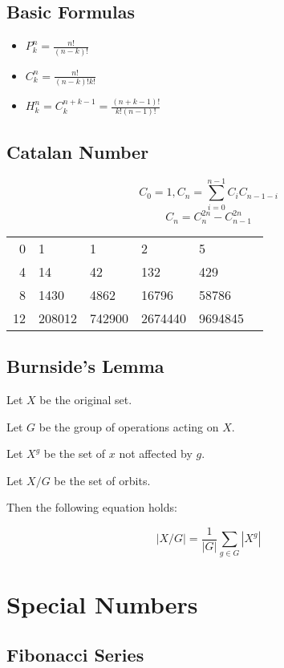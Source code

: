 \documentclass[twocolumn]{article}
\begin{document}
\subsection{Basic Formulas}

\begin{itemize}
    \item $P^n_k=\frac{n!}{(n-k)!}$
    \item $C^n_k=\frac{n!}{(n-k)!k!}$
    \item $H^n_k=C^{n+k-1}_k=\frac{(n+k-1)!}{k!(n-1)!}$
\end{itemize}

\subsection{Catalan Number}

$$
C_0=1, C_n=\sum_{i=0}^{n-1} C_i C_{n-1-i}
$$
$$
C_n=C_n^{2n}-C_{n-1}^{2n}
$$
\begin{center}
    \begin{tabular}{r|lllll}
        0 & 1 & 1 & 2 & 5 \\
        4 & 14 & 42 & 132 & 429 \\
        8 & 1430 & 4862 & 16796 & 58786 \\
        12 & 208012 & 742900 & 2674440 & 9694845
    \end{tabular}
\end{center}

\subsection{Burnside's Lemma}

Let $X$ be the original set.

Let $G$ be the group of operations acting on $X$.

Let $X^g$ be the set of $x$ not affected by $g$.

Let $X/G$ be the set of orbits.

Then the following equation holds:

$$
|X/G| = \frac{1}{|G|} \sum_{g \in G} |X^g|
$$



\section{Special Numbers}

\subsection{Fibonacci Series}
\end{document}
